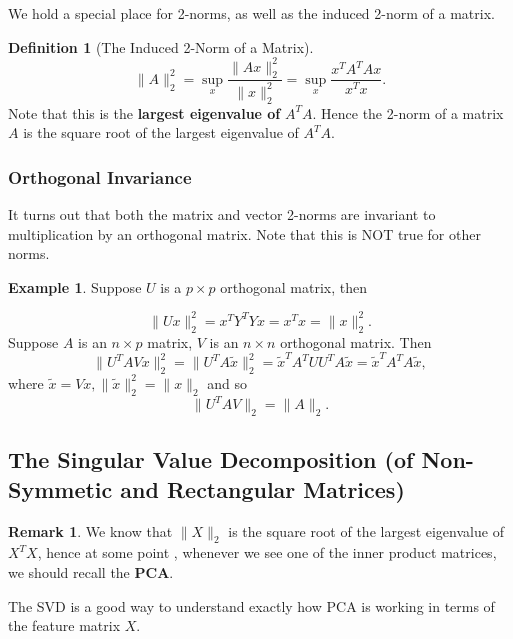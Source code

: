 \documentclass[11pt]{article}
\theoremstyle{definition}
\newtheorem{definition}{Definition}[section]
\newtheorem{remark}{Remark}[section]
\newtheorem{example}{Example}[section]
\numberwithin{equation}{section}
\begin{document}
We hold a special place for 2-norms, as well as the induced 2-norm of a matrix.

\begin{definition}[The Induced 2-Norm of a Matrix]
  \begin{equation}
    \|A\|_2^2 = \sup_x\frac{\|Ax\|^2_2}{\|x\|^2_2}=\sup_x\frac{x^TA^TAx}{x^Tx}.
  \end{equation}
  Note that this is the \textbf{largest eigenvalue of} $A^TA$. Hence the 2-norm of a matrix $A$ is the square root of the largest eigenvalue of $A^TA$.
\end{definition}

\subsubsection{Orthogonal Invariance} 
It turns out that both the matrix and vector 2-norms are invariant to multiplication by an orthogonal matrix. Note that this is NOT true for other norms.

\begin{example}
Suppose $U$ is a $p\times p$ orthogonal matrix, then

\begin{equation}
 \|Ux\|^2_2=x^TY^TYx=x^Tx=\|x\|^2_2.
\end{equation}
  Suppose $A$ is an $n\times p$ matrix, $V$ is an $n\times n$ orthogonal matrix. Then
  \begin{equation}
    \|U^TAVx\|^2_2=\|U^TA\tilde{x}\|^2_2=\tilde{x}^TA^TUU^TA\tilde{x}=\tilde{x}^TA^TA\tilde{x},
  \end{equation}
  where $\tilde{x}=Vx, \|\tilde{x}\|^2_2=\|x\|_2$ and so
  \begin{equation}
    \|U^TAV\|_2=\|A\|_2.
  \end{equation}

\end{example}


\subsection{The Singular Value Decomposition (of Non-Symmetic and Rectangular Matrices)}

\begin{remark}
 We know that $\| X \|_2$ is the square root of the largest eigenvalue of $X^T X$, hence at some point , whenever we see one of the inner product matrices, we should recall the \textbf{PCA}.

 The SVD is a good way to understand exactly how PCA is working in terms of the feature matrix $X$.
\end{remark}
\end{document}

